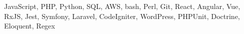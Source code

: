 \documentclass[margin,line]{resume}
\begin{document}
\begin{resume}
JavaScript, PHP, Python, SQL, AWS, bash, Perl, Git, React, Angular, Vue, RxJS, Jest, Symfony, Laravel, CodeIgniter, WordPress, PHPUnit, Doctrine, Eloquent, Regex














\end{resume}
\end{document}
